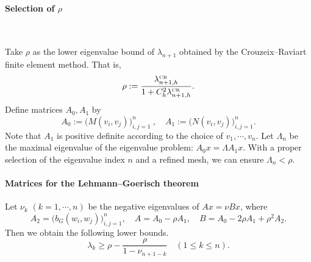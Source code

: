 \documentclass[a4,11pt]{article}
\numberwithin{equation}{section}
\newcommand{\CR}{\mbox{\tiny{CR}}}
\begin{document}
\paragraph{Selection of $\rho$}~

Take $\rho$ as the lower eigenvalue bound of $\lambda_{n+1}$ obtained by 
 the Crouzeix--Raviart finite element method. That is,
 $$
\rho:= \frac{\lambda^{\CR}_{n+1,h}}{1+C_h^2 \lambda^{\CR}_{n+1,h}}.
 $$
%
Define matrices $A_0, A_1$ by
\begin{equation}
	\label{eq:LG-method-matrix-A0-A1-steklov}
A_0 := \big( M(v_{i}, v_{j}) \big)_{i,j=1}^n~,
\quad 
A_1 := \big( N( v_{i},  v_{j}) \big)_{i,j=1}^n .
\end{equation}
Note that $A_1$ is positive definite according to the choice 
 of $v_1, \cdots, v_n$.
%
Let $\Lambda_n$ be the maximal eigenvalue of the eigenvalue problem: $A_0 x = \Lambda A_1 x$.
With a proper selection of the 	eigenvalue index $n$ and a refined mesh, we can ensure $\Lambda_n < \rho$.



\paragraph{Matrices for the Lehmann--Goerisch theorem }
Let ${\nu_k}$ $(k=1,\cdots,n)$ be the negative eigenvalues of $Ax=\nu Bx$, where
\begin{equation}
	\label{eq:LG-method-matrix-steklov}
A_2 = \big( b_G(w_i, w_j) \big)_{i,j=1}^n, \quad
A = A_0 - \rho A_1, \quad B = A_0 - 2 \rho A_1 + \rho^2 A_2.
\end{equation}
Then we obtain the following lower bounds.
\begin{equation}\label{Lehmann--Goerisch-bounds-h}
\lambda_{k} \geq \rho - \frac{\rho}{1 - {\nu}_{n+1-k}}  \quad (1\leq k\leq n).
\end{equation}
\end{document}
